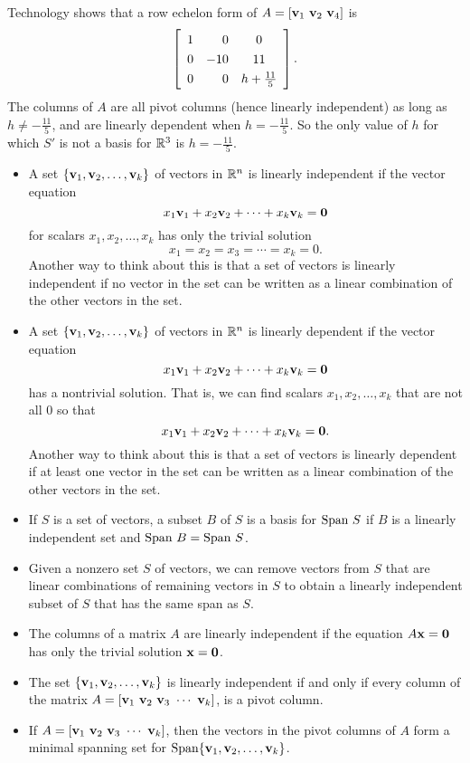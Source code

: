 \begin{example}
\item Technology shows that a row echelon form of $A = [\mathbf{v}_1 \ \mathbf{v}_2 \ \mathbf{v}_4]$ is 
\[\left[ \renewcommand{\arraystretch}{1.3} \begin{array}{crc} 1&0&0 \\ 0&-10&11 \\ 0&0&h+\frac{11}{5} \end{array} \right].\]
The columns of $A$ are all pivot columns (hence linearly independent) as long as $h \neq -\frac{11}{5}$, and are linearly dependent when $h = -\frac{11}{5}$. So the only value of $h$ for which $S'$ is not a basis for $\mathbb{R}^3$ is $h = -\frac{11}{5}$. 

\ea

\end{example}


\begin{itemize}
\item A set $\{\mathbf{v}_1, \mathbf{v}_2, \ldots, \mathbf{v}_k\}$ of vectors in $\mathbb{R}^n$ is linearly independent if the vector equation
\[x_1 \mathbf{v}_1 + x_2 \mathbf{v}_2 + \cdots + x_k \mathbf{v}_k = \mathbf{0}\]
for scalars $x_1, x_2, \ldots, x_k$ has only the trivial solution
\[x_1 = x_2 = x_3 = \cdots = x_k = 0.\]
Another way to think about this is that a set of vectors is linearly independent if no vector in the set can be written as a linear combination of the other vectors in the set.
\item A set $\{\mathbf{v}_1, \mathbf{v}_2, \ldots, \mathbf{v}_k\}$ of vectors in $\mathbb{R}^n$ is linearly dependent if the vector equation
\[x_1 \mathbf{v}_1 + x_2 \mathbf{v}_2 + \cdots + x_k \mathbf{v}_k = \mathbf{0}\]
has a nontrivial solution. That is, we can find scalars $x_1, x_2, \ldots, x_k$ that are not all 0 so that
\[x_1 \mathbf{v}_1 + x_2 \mathbf{v}_2 + \cdots + x_k \mathbf{v}_k = \mathbf{0}.\]
Another way to think about this is that a set of vectors is linearly dependent if at least one vector in the set can be written as a linear combination of the other vectors in the set.
\item If $S$ is a set of vectors, a subset $B$ of $S$ is a basis for $\text{Span} \ S$ if $B$ is a linearly independent set and $\text{Span} \ B = \text{Span} \ S$. 
\item Given a nonzero set $S$ of vectors, we can remove vectors from $S$ that are linear combinations of remaining vectors in $S$ to obtain a linearly independent subset of $S$ that has the same span as $S$.
\item The columns of a matrix $A$ are linearly independent if the equation $A \mathbf{x} = \mathbf{0}$ has only the trivial solution $\mathbf{x} = \mathbf{0}$.
\item The set $\{\mathbf{v}_1, \mathbf{v}_2, \ldots, \mathbf{v}_k\}$ is linearly independent if and only if every column of the matrix $A = [\vv_1 \ \vv_2 \ \vv_3 \ \cdots \ \vv_k]$, is a pivot column.
\item If $A = [\vv_1 \ \vv_2 \ \vv_3 \ \cdots \ \vv_k]$, then the vectors in the pivot columns of $A$ form a minimal spanning set for $\text{Span} \{\mathbf{v}_1, \mathbf{v}_2, \ldots, \mathbf{v}_k\}$.
\end{itemize}




